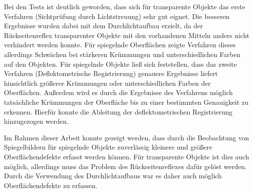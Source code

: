 %
Bei den Tests ist deutlich geworden, dass sich für transparente Objekte das erste Verfahren (Sichtprüfung durch Lichtstreuung) sehr gut eignet.
Die besseren Ergebnisse wurden dabei mit dem Durchlichtaufbau erzielt, da der Rückseitenreflex transparenter Objekte mit den vorhandenen Mitteln anders nicht verhindert werden konnte.
Für spiegelnde Oberflächen zeigte Verfahren dieses allerdings Schwächen bei stärkeren Krümmungen und unterschiedlichen Farben auf den Objekten.
Für spiegelnde Objekte ließ sich feststellen, dass das zweite Verfahren (Deflektometrische Registrierung) genauere Ergebnisse liefert hinsichtlich größerer Krümmungen oder unterschiedlichen Farben der Oberflächen.
Außerdem wird es durch die Ergebnisse des Verfahrens möglich tatsächliche Krümmungen der Oberfläche bis zu einer bestimmten Genauigkeit zu erkennen. Hierfür konnte die Ableitung der deflektometrischen Registrierung hinzugezogen werden.

\p
Im Rahmen dieser Arbeit konnte gezeigt werden, dass durch die Beobachtung von Spiegelbildern für spiegelnde Objekte zuverlässig kleinere und größere Oberflächendefekte erfasst werden können.
Für transparente Objekte ist dies auch möglich, allerdings muss das Problem des Rückseitenreflexes dafür gelöst werden. 
Durch die Verwendung des Durchlichtaufbaus war es daher auch möglich Oberflächendefekte zu erfassen.